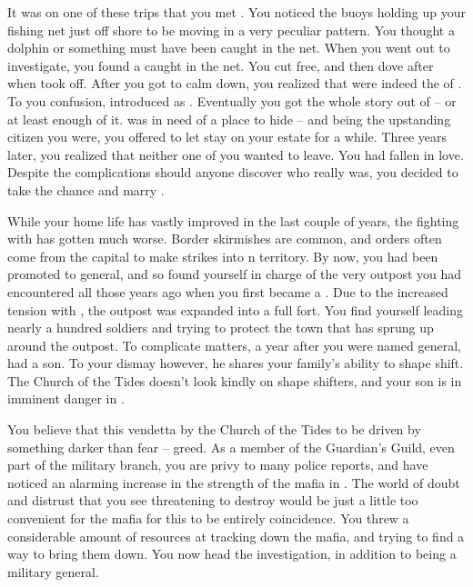 \documentclass[char]{NeptuneBall}
\begin{document}
It was on one of these trips that you met \cQueen{}. You noticed the buoys holding up your fishing net just off shore to be moving in a very peculiar pattern. You thought a dolphin or something must have been caught in the net. When you went out to investigate, you found a \cQueen{\mer} caught in the net. You cut \cQueen{\them} free, and then dove after \cQueen{\them} when \cQueen{\they} took off. After you got \cQueen{} to calm down, you realized that \cQueen{\they} were indeed the \cQueen{\King} of \pAtlantis{}. To you confusion, \cQueen{\they} introduced \cQueen{\themself} as \cQueen{\MYname}. Eventually you got the whole story out of \cQueen{\them} -- or at least enough of it. \cQueen{} was in need of a place to hide -- and being the upstanding citizen you were, you offered to let \cQueen{\them} stay on your estate for a while.  Three years later, you realized that neither one of you wanted \cQueen{\them} to leave. You had fallen in love. Despite the complications should anyone discover who \cQueen{} really was, you decided to take the chance and marry \cQueen{\them}.

While your home life has vastly improved in the last couple of years, the fighting with \pPacifica{} has gotten much worse. Border skirmishes are common, and orders often come from the capital to make strikes into \pPacifica{}n territory. By now, you had been promoted to general, and so found yourself in charge of the very outpost you had encountered all those years ago when you first became a \cGeneral{\mer}. Due to the increased tension with \pPacifica{}, the outpost was expanded into a full fort. You find yourself leading nearly a hundred soldiers and trying to protect the town that has sprung up around the outpost. To complicate matters, a year after you were named general, \cQueen{} had a son. To your dismay however, he shares your family's ability to shape shift. The Church of the Tides doesn't look kindly on shape shifters, and your son is in imminent danger in \pAtlantis{}.

You believe that this vendetta by the Church of the Tides to be driven by something darker than fear -- greed. As a member of the Guardian's Guild, even part of the military branch, you are privy to many police reports, and have noticed an alarming increase in the strength of the mafia in \pAtlantis{}. The world of doubt and distrust that you see threatening to destroy \pAtlantis{} would be just a little too convenient for the mafia for this to be entirely coincidence. You threw a considerable amount of resources at tracking down the mafia, and trying to find a way to bring them down. You now head the investigation, in addition to being a military general.
\end{document}
